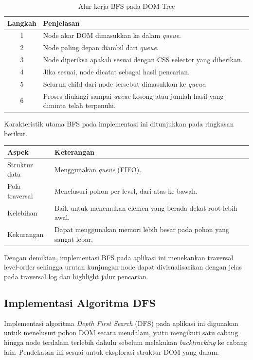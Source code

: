 \begin{table}[H]
\centering
\caption{Alur kerja BFS pada DOM Tree}
\label{tab:alur-bfs}
\begin{tabular}{|c|p{10cm}|}
\hline
\textbf{Langkah} & \textbf{Penjelasan} \\ \hline
1 & Node akar DOM dimasukkan ke dalam \textit{queue}. \\ \hline
2 & Node paling depan diambil dari \textit{queue}. \\ \hline
3 & Node diperiksa apakah sesuai dengan CSS selector yang diberikan. \\ \hline
4 & Jika sesuai, node dicatat sebagai hasil pencarian. \\ \hline
5 & Seluruh child dari node tersebut dimasukkan ke \textit{queue}. \\ \hline
6 & Proses diulangi sampai \textit{queue} kosong atau jumlah hasil yang diminta telah terpenuhi. \\ \hline
\end{tabular}
\end{table}

Karakteristik utama BFS pada implementasi ini ditunjukkan pada ringkasan berikut.

\begin{center}
\begin{tabular}{|l|p{8.5cm}|}
\hline
\textbf{Aspek} & \textbf{Keterangan} \\ \hline
Struktur data & Menggunakan \textit{queue} (FIFO). \\ \hline
Pola traversal & Menelusuri pohon per level, dari atas ke bawah. \\ \hline
Kelebihan & Baik untuk menemukan elemen yang berada dekat root lebih awal. \\ \hline
Kekurangan & Dapat menggunakan memori lebih besar pada pohon yang sangat lebar. \\ \hline
\end{tabular}
\end{center}

Dengan demikian, implementasi BFS pada aplikasi ini menekankan traversal level-order sehingga urutan kunjungan node dapat divisualisasikan dengan jelas pada traversal log dan highlight jalur pencarian.


\subsection{Implementasi Algoritma DFS}

Implementasi algoritma \textit{Depth First Search} (DFS) pada aplikasi ini digunakan untuk menelusuri pohon DOM secara mendalam, yaitu mengikuti satu cabang hingga node terdalam terlebih dahulu sebelum melakukan \textit{backtracking} ke cabang lain. Pendekatan ini sesuai untuk eksplorasi struktur DOM yang dalam.

